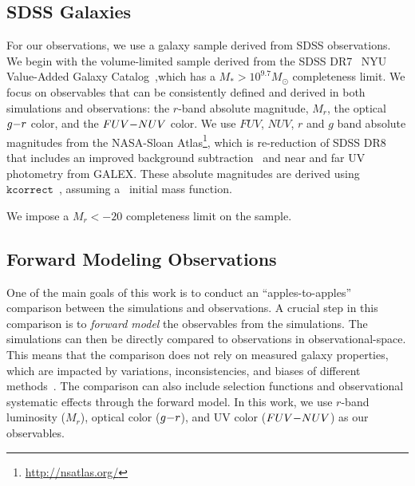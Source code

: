 \subsection{SDSS Galaxies} \label{sec:obs} 
For our observations, we use a galaxy sample derived from SDSS observations. 
We begin with the volume-limited \cite{tinker2011} sample derived from the SDSS
DR7~\citep{abazajian2009} NYU Value-Added Galaxy
Catalog~\citep[VAGC;][]{blanton2005},which has a $M_* > 10^{9.7} M_\odot$
completeness limit. 
We focus on observables that can be consistently defined and derived in both simulations 
and observations: the $r$-band absolute magnitude, $M_r$, the optical $g{-}r$
color, and the $FUV{-}NUV$ color. 
We use $FUV$, $NUV$, $r$ and $g$ band absolute magnitudes from the NASA-Sloan
Atlas\footnote{\url{http://nsatlas.org/}}, which is re-reduction of SDSS DR8
\citep{aihara2011} that includes an improved background subtraction~\citep{blanton2011} 
and near and far UV photometry from GALEX. These absolute magnitudes are
derived using $\mathtt{kcorrect}$~\citep{blanton2007a}, assuming
a~\cite{chabrier2003} initial mass function. 

We impose a $M_r < -20$ completeness limit on the \cite{tinker2011} sample.

\subsection{Forward Modeling Observations} \label{sec:fm} 
One of the main goals of this work is to conduct an ``apples-to-apples''
comparison between the simulations and observations. 
A crucial step in this comparison is to \emph{forward model} the
observables from the simulations. 
The simulations can then be directly compared to observations in
observational-space. 
This means that the comparison does not rely on measured galaxy properties,
which are impacted by variations, inconsistencies, and biases of different
methods~\citep{dickey2020}. 
The comparison can also include selection functions and observational systematic
effects through the forward model. 
In this work, we use $r$-band luminosity ($M_r$), optical color ($g{-}r$),
and UV color ($FUV{-}NUV$) as our observables. 

